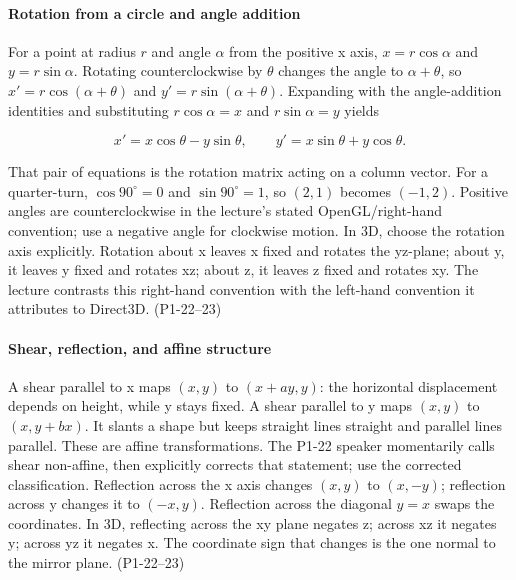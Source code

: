 \paragraph{Rotation from a circle and angle addition}\label{03-visual-computing-i-ch001-rotation-from-a-circle-and-angle-addition}

\hypertarget{03-visual-computing-i-ch001-rotation-from-a-circle-and-angle-addition}{}

For a point at radius \(r\) and angle \(\alpha\) from the positive x axis, \(x=r\cos\alpha\) and \(y=r\sin\alpha\). Rotating counterclockwise by \(\theta\) changes the angle to \(\alpha+\theta\), so \(x'=r\cos(\alpha+\theta)\) and \(y'=r\sin(\alpha+\theta)\). Expanding with the angle-addition identities and substituting \(r\cos\alpha=x\) and \(r\sin\alpha=y\) yields

\[
x'=x\cos\theta-y\sin\theta,\qquad y'=x\sin\theta+y\cos\theta.
\]

That pair of equations is the rotation matrix acting on a column vector. For a quarter-turn, \(\cos90^\circ=0\) and \(\sin90^\circ=1\), so \((2,1)\) becomes \((-1,2)\). Positive angles are counterclockwise in the lecture's stated OpenGL/right-hand convention; use a negative angle for clockwise motion. In 3D, choose the rotation axis explicitly. Rotation about x leaves x fixed and rotates the yz-plane; about y, it leaves y fixed and rotates xz; about z, it leaves z fixed and rotates xy. The lecture contrasts this right-hand convention with the left-hand convention it attributes to Direct3D. (P1-22--23)

\paragraph{Shear, reflection, and affine structure}\label{03-visual-computing-i-ch001-shear-reflection-and-affine-structure}

\hypertarget{03-visual-computing-i-ch001-shear-reflection-and-affine-structure}{}

A shear parallel to x maps \((x,y)\) to \((x+ay,y)\): the horizontal displacement depends on height, while y stays fixed. A shear parallel to y maps \((x,y)\) to \((x,y+bx)\). It slants a shape but keeps straight lines straight and parallel lines parallel. These are affine transformations. The P1-22 speaker momentarily calls shear non-affine, then explicitly corrects that statement; use the corrected classification. Reflection across the x axis changes \((x,y)\) to \((x,-y)\); reflection across y changes it to \((-x,y)\). Reflection across the diagonal \(y=x\) swaps the coordinates. In 3D, reflecting across the xy plane negates z; across xz it negates y; across yz it negates x. The coordinate sign that changes is the one normal to the mirror plane. (P1-22--23)

